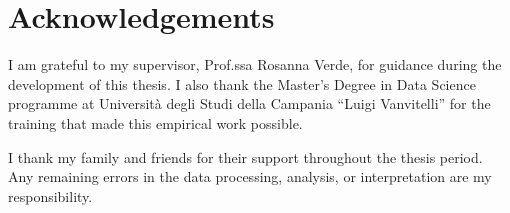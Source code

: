 \chapter*{Acknowledgements}

I am grateful to my supervisor, Prof.ssa Rosanna Verde, for guidance during the development of this thesis. I also thank the Master's Degree in Data Science programme at Universit\`a degli Studi della Campania ``Luigi Vanvitelli'' for the training that made this empirical work possible.

I thank my family and friends for their support throughout the thesis period. Any remaining errors in the data processing, analysis, or interpretation are my responsibility.
